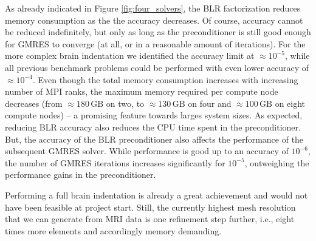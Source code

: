 \documentclass[a4paper,12pt]{article}
\begin{document}
As already indicated in Figure \ref{fig:four_solvers}, the BLR factorization reduces memory consumption as the the accuracy decreases. Of course, accuracy cannot be reduced indefinitely, but only as long as the preconditioner is still good enough for GMRES to converge (at all, or in a reasonable amount of iterations). For the more complex brain indentation we identified the accuracy limit at $\approx 10^{-5}$, while all previous benchmark problems could be performed with even lower accuracy of $\approx 10^{-4}$. Even though the total memory consumption increases with increasing number of MPI ranks, the maximum memory required per compute node decreases (from $\approx 180\,\mathrm{GB}$ on two, to $\approx 130\,\mathrm{GB}$ on four and $\approx 100\,\mathrm{GB}$ on eight compute nodes) -- a promising feature towards larges system sizes. As expected, reducing BLR accuracy also reduces the CPU time spent in the preconditioner. But, the accuracy of the BLR preconditioner also affects the performance of the subsequent GMRES solver. While performance is good up to an accuracy of $10^{-6}$, the number of GMRES iterations increases significantly for $10^{-5}$, outweighing the performance gains in the preconditioner. 

Performing a full brain indentation is already a great achievement and would not have been feasible at project start. Still, the currently highest mesh resolution that we can generate from MRI data is one refinement step further, i.e., eight times more elements and accordingly memory demanding. 
\end{document}
